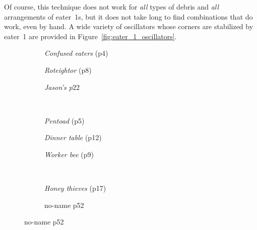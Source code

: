 Of course, this technique does not work for \emph{all} types of debris and \emph{all} arrangements of eater~1s, but it does not take long to find combinations that do work, even by hand. A wide variety of oscillators whose corners are stabilized by eater~1 are provided in Figure~\ref{fig:eater_1_oscillators}.

\begin{figure}[!htb]
	\centering
	\begin{subfigure}{.3\textwidth}%
		\centering
		\caption{\emph{Confused eaters} (p4)}
		\label{fig:confused_eaters}
	\end{subfigure}%
	\begin{subfigure}{.3\textwidth}%
		\centering
		\caption{\emph{Roteightor} (p8)}
		\label{fig:roteightor}
	\end{subfigure}%
	\begin{subfigure}{.33\textwidth}%
		\centering
		\caption{\emph{Jason's p$22$}}
		\label{fig:period_22}
	\end{subfigure} \\[0.2in]
	\begin{subfigure}{.3\textwidth}%
		\centering
		\caption{\emph{Pentoad} (p5)}
		\label{fig:pentoad}
	\end{subfigure}%
	\begin{subfigure}{.3\textwidth}%
		\centering
		\caption{\emph{Dinner table} (p12)}
		\label{fig:dinner_table}
	\end{subfigure}%
	\begin{subfigure}{.33\textwidth}%
		\centering
		\caption{\emph{Worker bee} (p9)}
		\label{fig:worker_bee}
	\end{subfigure} \\[0.2in]
	\begin{subfigure}{.3\textwidth}%
		\centering
		\caption{\emph{Honey thieves} (p17)}
		\label{fig:honey_thieves}
	\end{subfigure}%
	\begin{subfigure}{.3\textwidth}%
		\centering
		\caption{no-name p52}
		\label{fig:period_52}
	\end{subfigure}%

\end{figure}
